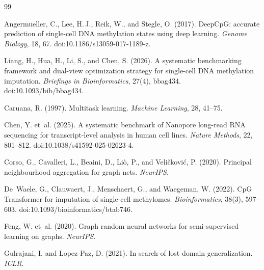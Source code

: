 \documentclass[11pt,a4paper]{article}
\begin{document}
{}
\begin{thebibliography}{99}
    \footnotesize   %
    \raggedright    %

    Angermueller, C., Lee, H.\,J., Reik, W., and Stegle, O. (2017).
    \newblock DeepCpG: accurate prediction of single-cell DNA methylation states using deep learning.
    \newblock \textit{Genome Biology}, 18, 67. doi:10.1186/s13059-017-1189-z.

    Liang, H., Hua, H., Li, S., and Chen, S. (2026).
    \newblock A systematic benchmarking framework and dual-view optimization strategy for single-cell DNA methylation imputation.
    \newblock \textit{Briefings in Bioinformatics}, 27(4), bbag434. doi:10.1093/bib/bbag434.

    Caruana, R. (1997).
    \newblock Multitask learning.
    \newblock \textit{Machine Learning}, 28, 41--75.

    Chen, Y. et~al. (2025).
    \newblock A systematic benchmark of Nanopore long-read RNA sequencing for transcript-level analysis in human cell lines.
    \newblock \textit{Nature Methods}, 22, 801--812. doi:10.1038/s41592-025-02623-4.

    Corso, G., Cavalleri, L., Beaini, D., Li\`o, P., and Veli\v{c}kovi\'c, P. (2020).
    \newblock Principal neighbourhood aggregation for graph nets.
    \newblock \textit{NeurIPS}.

    De~Waele, G., Clauwaert, J., Menschaert, G., and Waegeman, W. (2022).
    \newblock CpG Transformer for imputation of single-cell methylomes.
    \newblock \textit{Bioinformatics}, 38(3), 597--603. doi:10.1093/bioinformatics/btab746.

    Feng, W. et~al. (2020).
    \newblock Graph random neural networks for semi-supervised learning on graphs.
    \newblock \textit{NeurIPS}.

    Gulrajani, I. and Lopez-Paz, D. (2021).
    \newblock In search of lost domain generalization.
    \newblock \textit{ICLR}.


\end{thebibliography}
\end{document}
